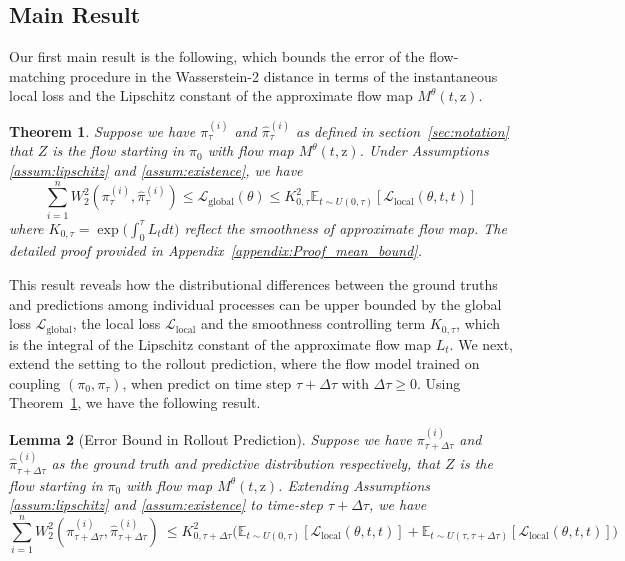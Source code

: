 \documentclass{article}
\newtheorem{theorem}{Theorem}
\newtheorem{lemma}[theorem]{Lemma}
\begin{document}
\subsection{Main Result}
\label{sec:theoretical_results}
Our first main result is the following, which bounds the error of the flow-matching procedure in the Wasserstein-2 distance in terms of the instantaneous local loss and the Lipschitz constant of the approximate flow map $M^{\theta}(t, \mathrm{z})$.

\begin{theorem}
\label{thm:main_bound}
Suppose we have $\pi^{(i)}_{\tau}$ and $\hat{\pi}^{(i)}_{\tau}$ as defined in section~\ref{sec:notation} that $Z$ is the flow starting in $\pi_0$ with flow map $M^{\theta}(t, \mathrm{z})$. Under Assumptions \ref{assum:lipschitz} and \ref{assum:existence}, we have 
$$ \sum_{i=1}^{n} W_2^2(\pi^{(i)}_{\tau}, \hat{\pi}^{(i)}_{\tau}) \leq \mathcal{L}_{\text{global}}(\theta) \leq K^2_{0,\tau} \mathbb{E}_{t \sim U(0,\tau)}[\mathcal{L}_{\text{local}}(\theta,t,t)]$$ 
where $K_{0,\tau} = \exp \Big(\int_{0}^{\tau} L_t dt \Big)$ reflect the smoothness of approximate flow map. The detailed proof provided in Appendix~\ref{appendix:Proof_mean_bound}.
\end{theorem}
This result reveals how the distributional differences between the ground truths and predictions among individual processes can be upper bounded by the global loss $\mathcal{L}_{\text{global}}$, the local loss $\mathcal{L}_{\text{local}}$ and the smoothness controlling term $K_{0, \tau}$, which is the integral of the Lipschitz constant of the approximate flow map $L_t$. We next, extend the setting to the rollout prediction, where the flow model trained on coupling $(\pi_0, \pi_{\tau})$, when predict on time step $\tau + \Delta \tau$ with $\Delta\tau \geq 0$. Using Theorem~\ref{thm:main_bound}, we have the following result.

\begin{lemma}[Error Bound in Rollout Prediction]
\label{lem:err_rollot}
Suppose we have $\pi^{(i)}_{\tau + \Delta \tau}$ and $\hat{\pi}^{(i)}_{\tau+ \Delta \tau}$ as the ground truth and predictive distribution respectively, that $Z$ is the flow starting in $\pi_0$ with flow map $M^{\theta}(t, \mathrm{z})$. Extending Assumptions \ref{assum:lipschitz} and \ref{assum:existence} to time-step $\tau + \Delta \tau$, we have 
$$ \sum_{i=1}^{n} W_2^2(\pi^{(i)}_{\tau+ \Delta \tau}, \hat{\pi}^{(i)}_{\tau + \Delta \tau}) \ \leq K^2_{0,\tau+ \Delta \tau} \Big(\mathbb{E}_{t \sim U(0,\tau)}[\mathcal{L}_{\text{local}}(\theta,t,t)] +  \mathbb{E}_{t \sim U(\tau,\tau+\Delta \tau)}[\mathcal{L}_{\text{local}}(\theta,t,t)]\Big)$$  
\end{lemma}
\end{document}
